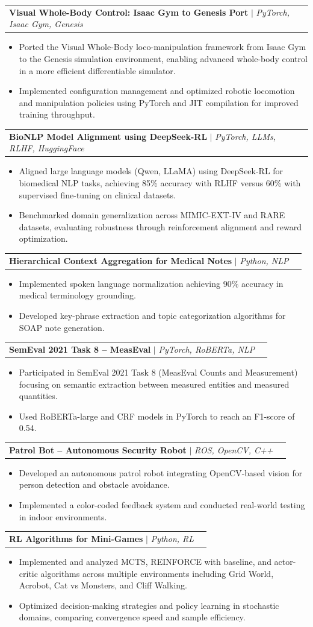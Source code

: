 \documentclass[letterpaper,11pt]{article}
\makeatletter
\newcommand{\resumeItem}[1]{
  \item\small{
    {#1 \vspace{-2pt}}
  }
}
\newcommand{\resumeProjectHeading}[2]{
    \item
    \begin{tabular*}{0.97\textwidth}{l@{\extracolsep{\fill}}r}
      \small#1 & #2 \\
    \end{tabular*}\vspace{-7pt}
}
\newcommand{\resumeItemListStart}{\begin{itemize}[noitemsep, topsep=0pt, parsep=0pt]}
\newcommand{\resumeItemListEnd}{\end{itemize}\vspace{-5pt}}
\makeatother
\begin{document}
  \resumeProjectHeading
    {\textbf{Visual Whole-Body Control: Isaac Gym to Genesis Port} $|$ \emph{PyTorch, Isaac Gym, Genesis}}{}
    \resumeItemListStart
      \resumeItem{Ported the Visual Whole-Body loco-manipulation framework from Isaac Gym to the Genesis simulation environment, enabling advanced whole-body control in a more efficient differentiable simulator.}
      \resumeItem{Implemented configuration management and optimized robotic locomotion and manipulation policies using PyTorch and JIT compilation for improved training throughput.}
    \resumeItemListEnd

  \resumeProjectHeading
    {\textbf{BioNLP Model Alignment using DeepSeek-RL} $|$ \emph{PyTorch, LLMs, RLHF, HuggingFace}}{}
    \resumeItemListStart
      \resumeItem{Aligned large language models (Qwen, LLaMA) using DeepSeek-RL for biomedical NLP tasks, achieving 85\% accuracy with RLHF versus 60\% with supervised fine-tuning on clinical datasets.}
      \resumeItem{Benchmarked domain generalization across MIMIC-EXT-IV and RARE datasets, evaluating robustness through reinforcement alignment and reward optimization.}
    \resumeItemListEnd

  \resumeProjectHeading
    {\textbf{Hierarchical Context Aggregation for Medical Notes} $|$ \emph{Python, NLP}}{}
    \resumeItemListStart
      \resumeItem{Implemented spoken language normalization achieving 90\% accuracy in medical terminology grounding.}
      \resumeItem{Developed key-phrase extraction and topic categorization algorithms for SOAP note generation.}
    \resumeItemListEnd

  \resumeProjectHeading
    {\textbf{SemEval 2021 Task 8 – MeasEval} $|$ \emph{PyTorch, RoBERTa, NLP}}{}
    \resumeItemListStart
      \resumeItem{Participated in SemEval 2021 Task 8 (MeasEval Counts and Measurement) focusing on semantic extraction between measured entities and measured quantities.}
      \resumeItem{Used RoBERTa-large and CRF models in PyTorch to reach an F1-score of 0.54.}
    \resumeItemListEnd

  \resumeProjectHeading
    {\textbf{Patrol Bot – Autonomous Security Robot} $|$ \emph{ROS, OpenCV, C++}}{}
    \resumeItemListStart
      \resumeItem{Developed an autonomous patrol robot integrating OpenCV-based vision for person detection and obstacle avoidance.}
      \resumeItem{Implemented a color-coded feedback system and conducted real-world testing in indoor environments.}
    \resumeItemListEnd

  \resumeProjectHeading
    {\textbf{RL Algorithms for Mini-Games} $|$ \emph{Python, RL}}{}
    \resumeItemListStart
      \resumeItem{Implemented and analyzed MCTS, REINFORCE with baseline, and actor-critic algorithms across multiple environments including Grid World, Acrobot, Cat vs Monsters, and Cliff Walking.}
      \resumeItem{Optimized decision-making strategies and policy learning in stochastic domains, comparing convergence speed and sample efficiency.}
    \resumeItemListEnd
\end{document}
